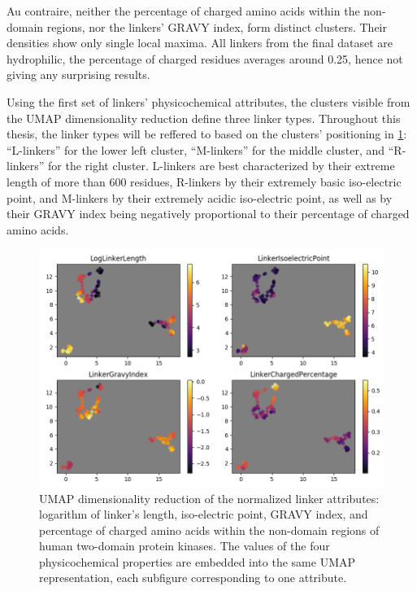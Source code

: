 		Au contraire, neither the percentage of charged amino acids within the non-domain
		regions, nor the linkers' GRAVY index, form distinct clusters.
		Their densities show only single local maxima.
		All linkers from the final dataset are hydrophilic, the percentage of charged residues
		averages around 0.25, hence not giving any surprising results.

	\label{res:first:umap}

		Using the first set of linkers' physicochemical attributes, the clusters visible from
		the UMAP dimensionality reduction define three linker types.
		Throughout this thesis, the linker types will be reffered to based on the clusters'
		positioning in \cref{fig:umap}: ``L-linkers'' for the lower left cluster,
		``M-linkers'' for the middle cluster, and ``R-linkers'' for the right cluster.
		L-linkers are best characterized by their extreme length of more than 600 residues,
		R-linkers by their extremely basic iso-electric point, and M-linkers by their
		extremely acidic iso-electric point, as well as by their GRAVY index being negatively
		proportional to their percentage of charged amino acids.

		\begin{figure}
			\centering
			\includegraphics[width=\linewidth]{img/linker_umap.png}
			\caption{UMAP dimensionality reduction of the normalized linker attributes:
			logarithm of linker's length, iso-electric point, GRAVY index, and percentage of
			charged amino acids within the non-domain regions of human two-domain protein
			kinases. The values of the four physicochemical properties are embedded into the
			same UMAP representation, each subfigure corresponding to one attribute.}
			\label{fig:umap}
		\end{figure}

